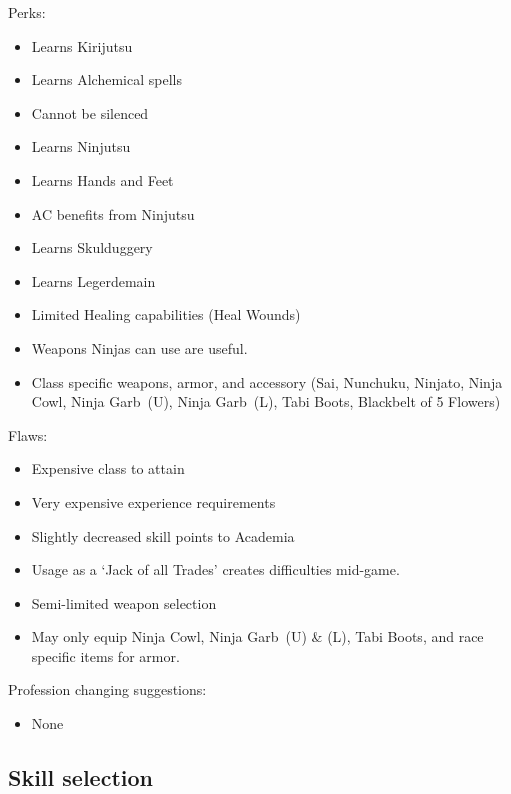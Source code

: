 \documentclass[12pt]{article}
\providecommand{\tightlist}{%
  \setlength{\itemsep}{0pt}\setlength{\parskip}{0pt}}
\newcommand{\indexSpell}[1]{\index{#1}}
\newcommand{\spell}[1]{#1\indexSpell{#1}}
\newcommand{\WviiTwoColumnSetup}{\raggedcolumns\RaggedRight}
\begin{document}
\begin{multicols}{2}\WviiTwoColumnSetup
Perks:

\begin{itemize}
\item
  Learns Kirijutsu
\item
  Learns Alchemical spells
\item
  Cannot be silenced
\item
  Learns Ninjutsu
\item
  Learns Hands and Feet
\item
  AC benefits from Ninjutsu
\item
  Learns Skulduggery
\item
  Learns Legerdemain
\item
  Limited Healing capabilities (\spell{Heal Wounds})
\item
  Weapons Ninjas can use are useful.
\item
  Class specific weapons, armor, and accessory (Sai, Nunchuku, Ninjato,
  Ninja Cowl, Ninja Garb~(U), Ninja Garb~(L), Tabi Boots, Blackbelt of 5
  Flowers)
\end{itemize}
\columnbreak

Flaws:

\begin{itemize}
\item
  Expensive class to attain
\item
  Very expensive experience requirements
\item
  Slightly decreased skill points to Academia
\item
  Usage as a `Jack of all Trades' creates difficulties mid-game.
\item
  Semi-limited weapon selection
\item
  May only equip Ninja Cowl, Ninja Garb~(U) \& (L), Tabi Boots, and race
  specific items for armor.
\end{itemize}
\end{multicols}

Profession changing suggestions:

\begin{itemize}
\tightlist
\item
  None
\end{itemize}

\subsection{Skill selection}\label{skill-selection}
\end{document}
